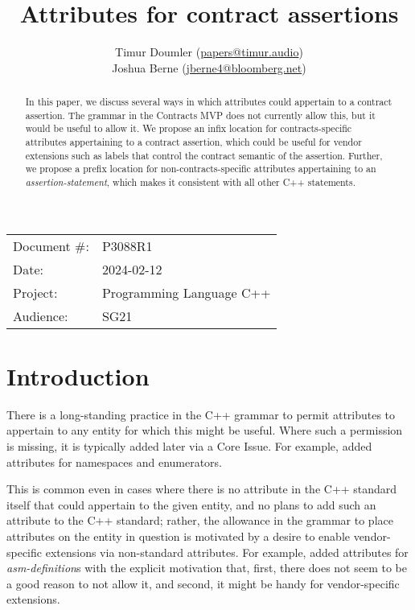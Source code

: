 

 \usepackage[bottom]{footmisc} 


\title{Attributes for contract assertions}
\author{ Timur Doumler \small(\href{mailto:papers@timur.audio}{papers@timur.audio})  \\
Joshua Berne \small(\href{mailto:jberne4@bloomberg.net}{jberne4@bloomberg.net})
}
\date{}
\maketitle

\begin{tabular}{ll}
Document \#: & P3088R1 \\
Date: &2024-02-12 \\
Project: & Programming Language C++ \\
Audience: & SG21
\end{tabular}

\begin{abstract}
In this paper, we discuss several ways in which attributes could appertain to a contract assertion. The grammar in the Contracts MVP does not currently allow this, but it would be useful to allow it. We propose an infix location for contracts-specific attributes appertaining to a contract assertion, which could be useful for vendor extensions such as labels that control the contract semantic of the assertion. Further, we propose a prefix location for non-contracts-specific attributes appertaining to an \emph{assertion-statement}, which makes it consistent with all other C++ statements.
\end{abstract}

\section{Introduction}
\label{sec:intro}

There is a long-standing practice in the C++ grammar to permit attributes to appertain to any entity for which this might be useful. Where such a permission is missing, it is typically added later via a Core Issue. For example, \cite{CWG1657} added attributes for namespaces and enumerators.

This is common even in cases where there is no attribute in the C++ standard itself that could appertain to the given entity, and no plans to add such an attribute to the C++ standard; rather, the allowance in the grammar to place attributes on the entity in question is motivated by a desire to enable vendor-specific extensions via non-standard attributes. For example, \cite{CWG2262} added attributes for \emph{asm-definition}s with the explicit motivation that, first, there does not seem to be a good reason to not allow it, and second, it might be handy for vendor-specific extensions.

